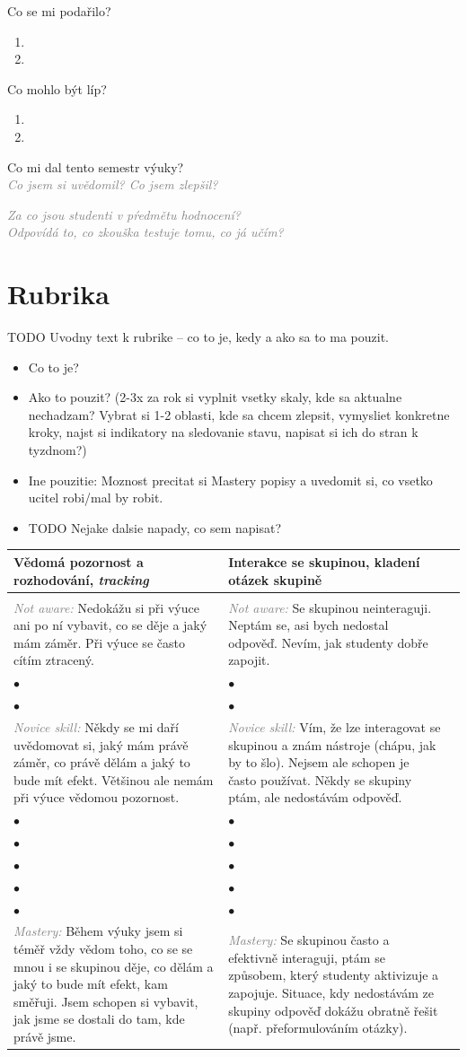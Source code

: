 \documentclass[twoside,openany,10pt]{book}
\makeatletter
\newcommand{\note}[1]{\textcolor{gray}{\small\itshape #1}}
\newcommand{\marginsection}[3]{\marginpar{\raisebox{#2\height}{
\begin{turn}{#1}
\bfseries \color{gray} \large
#3\end{turn}}}}
\newcommand{\rubricpage}[8]{
\newpage
\begin{tabular}{@{}>{\small}C{0.48\textwidth}>{\small}C{0.48\textwidth}@{}l@{}}
\normalsize \bfseries #1 & \normalsize \bfseries #5 & \\[1em] \hline \\[-1.2em]
	\justify \note{Not aware:} #2 & \justify \note{Not aware:} #6 & \\[2em]
$\bullet$ & $\bullet$ & \\
$\bullet$ & $\bullet$ & \\
\justify \note{Novice skill:} #3 & \justify \note{Novice skill:} #7 & \\[3em]
$\bullet$ & $\bullet$ & \\
$\bullet$ & $\bullet$ & \\
$\bullet$ & $\bullet$ & \\
$\bullet$ & $\bullet$ & \\
$\bullet$ & $\bullet$ & \\
\justify \note{Mastery:} #4 & \justify \note{Mastery:} #8 &
\end{tabular}
}
\makeatother
\begin{document}
Co se mi podařilo?
\begin{enumerate}
\item
\item
\end{enumerate}

Co mohlo být líp?
\begin{enumerate}
\item
\item
\end{enumerate}

Co mi dal tento semestr výuky?\\
\note{Co jsem si uvědomil? Co jsem zlepšil?}

\newpage
\marginsection{-90}{1}{volné poznámky}
\vspace*{-2em}
\note{Za co jsou studenti v pŕedmětu hodnocení?\\
Odpovídá to, co zkouška testuje tomu, co já učím?}


\restoregeometry
\chapter*{Rubrika}

TODO Uvodny text k rubrike -- co to je, kedy a ako sa to ma pouzit.
\begin{itemize}
\item Co to je?
\item Ako to pouzit? (2-3x za rok si vyplnit vsetky skaly, kde sa aktualne nechadzam? Vybrat si 1-2 oblasti, kde sa chcem zlepsit, vymysliet konkretne kroky, najst si indikatory na sledovanie stavu, napisat si ich do stran k tyzdnom?)
\item Ine pouzitie: Moznost precitat si Mastery popisy a uvedomit si, co vsetko ucitel robi/mal by robit.
\item TODO Nejake dalsie napady, co sem napisat?
\end{itemize}

\newpage
\rubricpage{Vědomá pozornost a rozhodování, \textit{tracking}}
{Nedokážu si při výuce ani po ní vybavit, co se děje a jaký mám záměr. Při výuce se často cítím ztracený.}
{Někdy se mi daří uvědomovat si, jaký mám právě záměr, co právě dělám a jaký to bude mít efekt. Většinou ale nemám při výuce vědomou pozornost.}
{Během výuky jsem si téměř vždy vědom toho, co se se mnou i se skupinou děje, co dělám a jaký to bude mít efekt, kam směřuji. Jsem schopen si vybavit, jak jsme se dostali do tam, kde právě jsme.}
{Interakce se skupinou, kladení otázek skupině}
{Se skupinou neinteraguji. Neptám se, asi bych nedostal odpověď. Nevím, jak studenty dobře zapojit.}
{Vím, že lze interagovat se skupinou a znám nástroje (chápu, jak by to šlo). Nejsem ale schopen je často používat. Někdy  se skupiny ptám, ale nedostávám odpověď.}
{Se skupinou často a efektivně interaguji, ptám se způsobem, který studenty aktivizuje a zapojuje. Situace, kdy nedostávám ze skupiny odpověď dokážu obratně řešit (např. přeformulováním otázky).}
\end{document}
